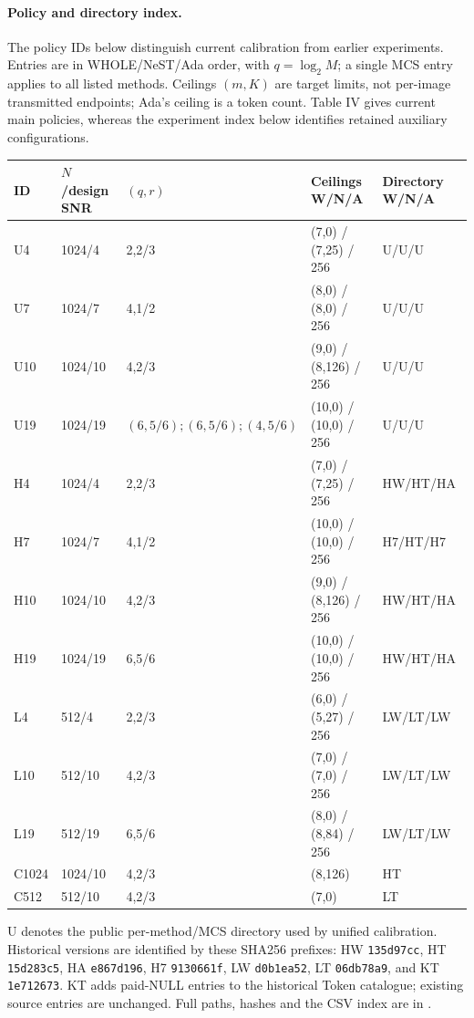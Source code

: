 \paragraph{Policy and directory index.}
The policy IDs below distinguish current calibration from earlier experiments. Entries are in WHOLE/NeST/Ada order, with $q=\log_2 M$; a single MCS entry applies to all listed methods. Ceilings $(m,K)$ are target limits, not per-image transmitted endpoints; Ada's ceiling is a token count. Table IV gives current main policies, whereas the experiment index below identifies retained auxiliary configurations.
\begin{longtable}{@{}lllp{4.3cm}l@{}}\toprule
ID & $N$/design SNR & $(q,r)$ & Ceilings W/N/A & Directory W/N/A\\\midrule\endhead
U4 & 1024/4 & 2,2/3 & (7,0) / (7,25) / 256 & U/U/U\\
U7 & 1024/7 & 4,1/2 & (8,0) / (8,0) / 256 & U/U/U\\
U10 & 1024/10 & 4,2/3 & (9,0) / (8,126) / 256 & U/U/U\\
U19 & 1024/19 & $(6,5/6);(6,5/6);(4,5/6)$ & (10,0) / (10,0) / 256 & U/U/U\\
H4 & 1024/4 & 2,2/3 & (7,0) / (7,25) / 256 & HW/HT/HA\\
H7 & 1024/7 & 4,1/2 & (10,0) / (10,0) / 256 & H7/HT/H7\\
H10 & 1024/10 & 4,2/3 & (9,0) / (8,126) / 256 & HW/HT/HA\\
H19 & 1024/19 & 6,5/6 & (10,0) / (10,0) / 256 & HW/HT/HA\\
L4 & 512/4 & 2,2/3 & (6,0) / (5,27) / 256 & LW/LT/LW\\
L10 & 512/10 & 4,2/3 & (7,0) / (7,0) / 256 & LW/LT/LW\\
L19 & 512/19 & 6,5/6 & (8,0) / (8,84) / 256 & LW/LT/LW\\
C1024 & 1024/10 & 4,2/3 & (8,126) & HT\\
C512 & 512/10 & 4,2/3 & (7,0) & LT\\
\bottomrule\end{longtable}
U denotes the public per-method/MCS directory used by unified calibration. Historical versions are identified by these SHA256 prefixes: HW \texttt{135d97cc}, HT \texttt{15d283c5}, HA \texttt{e867d196}, H7 \texttt{9130661f}, LW \texttt{d0b1ea52}, LT \texttt{06db78a9}, and KT \texttt{1e712673}. KT adds paid-NULL entries to the historical Token catalogue; existing source entries are unchanged. Full paths, hashes and the CSV index are in .
